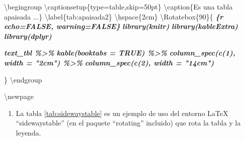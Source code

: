 \documentclass[12pt,a4paper,oneside,]{article}
\newenvironment{Shaded}{\begin{snugshade}}{\end{snugshade}}
\newcommand{\InformationTok}[1]{\textcolor[rgb]{0.56,0.35,0.01}{\textbf{\textit{#1}}}}
\newcommand{\NormalTok}[1]{#1}
\providecommand{\tightlist}{%
  \setlength{\itemsep}{0pt}\setlength{\parskip}{0pt}}
\numberwithin{dummy}{section}
\theoremstyle{ocrenumbox}
\theoremstyle{blacknumex}
\theoremstyle{blacknumbox}
\theoremstyle{ocrenum}
\theoremstyle{ocrenum}
\begin{document}
\begin{Shaded}
\begin{Highlighting}[]

\NormalTok{\textbackslash{}begingroup}
\NormalTok{\textbackslash{}captionsetup\{type=table,skip=50pt\}}
\NormalTok{\textbackslash{}caption\{Es una tabla apaisada ...\} \textbackslash{}label\{tab:apaisada2\}}
\NormalTok{\textbackslash{}hspace\{2cm\}}
\NormalTok{\textbackslash{}Rotatebox\{90\}\{}
\InformationTok{\textasciigrave{}\textasciigrave{}\textasciigrave{}\{r echo=FALSE, warning=FALSE\}}
\InformationTok{library(knitr)}
\InformationTok{library(kableExtra)}
\InformationTok{library(dplyr)}

\InformationTok{text\_tbl \%\textgreater{}\%}
\InformationTok{  kable(booktabs = TRUE) \%\textgreater{}\% }
\InformationTok{      column\_spec(c(1), width = "2cm") \%\textgreater{}\% }
\InformationTok{      column\_spec(c(2), width = "14cm")}

\InformationTok{\textasciigrave{}\textasciigrave{}\textasciigrave{}}
\NormalTok{\}}
\NormalTok{\textbackslash{}endgroup}

\NormalTok{\textbackslash{}newpage}
\end{Highlighting}
\end{Shaded}

\begin{enumerate}
\def\labelenumi{\arabic{enumi}.}
\setcounter{enumi}{2}
\tightlist
\item
  La tabla \ref{tab:sidewaystable} es un ejemplo de uso del entorno
  LaTeX ``sidewaystable'' (en el paquete ``rotating'' incluido) que rota
  la tabla y la leyenda.
\end{enumerate}
\end{document}
